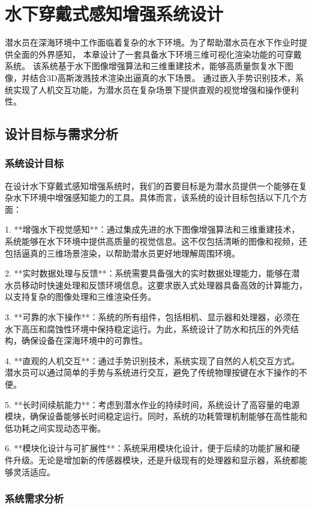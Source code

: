 
\chapter{水下穿戴式感知增强系统设计}
潜水员在深海环境中工作面临着复杂的水下环境。为了帮助潜水员在水下作业时提供全面的外界感知，
本章设计了一套具备水下环境三维可视化渲染功能的可穿戴系统。
该系统基于水下图像增强算法和三维重建技术，能够高质量恢复水下图像，并结合3D高斯泼溅技术渲染出逼真的水下场景。
通过嵌入手势识别技术，系统实现了人机交互功能，为潜水员在复杂场景下提供直观的视觉增强和操作便利性。

\section{设计目标与需求分析}
\subsection{系统设计目标}

在设计水下穿戴式感知增强系统时，我们的首要目标是为潜水员提供一个能够在复杂水下环境中增强感知能力的工具。具体而言，该系统的设计目标包括以下几个方面：

1. **增强水下视觉感知**：通过集成先进的水下图像增强算法和三维重建技术，系统能够在水下环境中提供高质量的视觉信息。这不仅包括清晰的图像和视频，还包括逼真的三维场景渲染，以帮助潜水员更好地理解周围环境。

2. **实时数据处理与反馈**：系统需要具备强大的实时数据处理能力，能够在潜水员移动时快速处理和反馈环境信息。这要求嵌入式处理器具备高效的计算能力，以支持复杂的图像处理和三维渲染任务。

3. **可靠的水下操作**：系统的所有组件，包括相机、显示器和处理器，必须在水下高压和腐蚀性环境中保持稳定运行。为此，系统设计了防水和抗压的外壳结构，确保设备在深海环境中的可靠性。

4. **直观的人机交互**：通过手势识别技术，系统实现了自然的人机交互方式。潜水员可以通过简单的手势与系统进行交互，避免了传统物理按键在水下操作的不便。

5. **长时间续航能力**：考虑到潜水作业的持续时间，系统设计了高容量的电源模块，确保设备能够长时间稳定运行。同时，系统的功耗管理机制能够在高性能和低功耗之间实现动态平衡。

6. **模块化设计与可扩展性**：系统采用模块化设计，便于后续的功能扩展和硬件升级。无论是增加新的传感器模块，还是升级现有的处理器和显示器，系统都能够灵活适应。

\subsection{系统需求分析}

